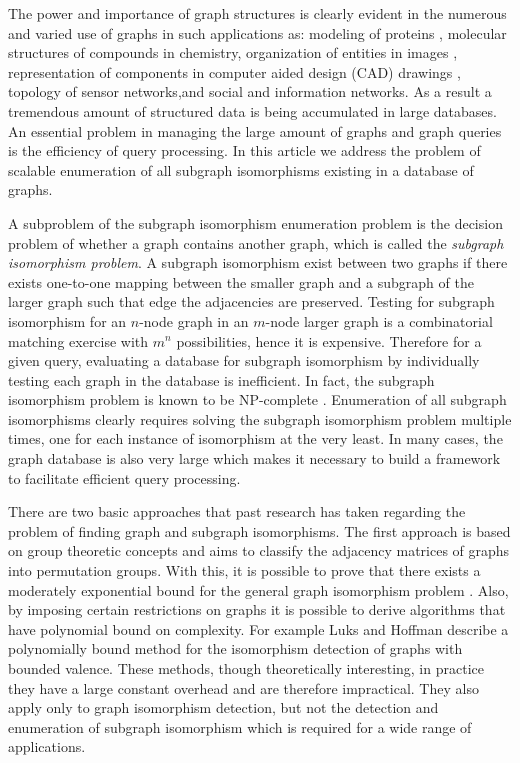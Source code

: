 The power and importance of graph structures is clearly evident in the numerous and varied use of graphs in such applications as: modeling of proteins
\cite{chi_muntz_nijssen2005}, molecular structures of compounds in chemistry\cite{willet_barnard_john1998}\cite{agrafiotis2007}, organization of entities 
in images\cite{petrakis_faloutsos1997} \cite{burge_kropatsch1999}, representation of components in computer aided design (CAD) drawings \cite{cordella2000}, 
topology of sensor networks\cite{li_wan_wang2003},and social and information networks\cite{cai_he_yan2005}. As a result a tremendous amount of structured 
data is being accumulated in large databases. An essential problem in managing the large amount of graphs and graph queries is the efficiency of query 
processing. In this article we address the problem of scalable enumeration of all subgraph isomorphisms existing in a database of graphs.

A subproblem of the subgraph isomorphism enumeration problem is the decision problem of whether a graph contains another graph, which is called the 
\textit{subgraph isomorphism problem}. A subgraph isomorphism exist between two graphs if there exists one-to-one mapping between the smaller graph 
and a subgraph of the larger graph such that edge the adjacencies are preserved. 
Testing for subgraph isomorphism for an $n$-node graph in an $m$-node larger graph is a combinatorial matching exercise with $m^n$ possibilities, hence it is 
expensive. Therefore for a given query, evaluating a database for subgraph isomorphism by individually testing each graph in the database is 
inefficient.  In fact, the subgraph isomorphism problem is known to be NP-complete \cite{cook1971_np}. Enumeration of all subgraph isomorphisms clearly requires 
solving the subgraph isomorphism problem multiple times, one for each instance of isomorphism at the very least. In  many cases, the graph database is also very 
large which makes it necessary to build a framework to facilitate efficient query processing.

There are two basic approaches that past research has taken regarding the problem of finding graph and subgraph isomorphisms. The first approach is based on 
group theoretic concepts and aims to classify the adjacency matrices of graphs into permutation groups. With this, it is possible to prove that there exists 
a moderately exponential bound for the general graph isomorphism problem \cite{babai1981}. Also, by imposing certain restrictions on graphs it is possible to 
derive algorithms that have polynomial bound on complexity. For example  Luks and Hoffman\cite{hoffmann1982} describe a polynomially bound method for the 
isomorphism detection of graphs with bounded valence. These methods, though theoretically interesting, in practice they have a large constant overhead and 
are therefore impractical. They also apply only to graph isomorphism detection, but not the detection and enumeration of subgraph isomorphism which is 
required for a wide range of applications.

